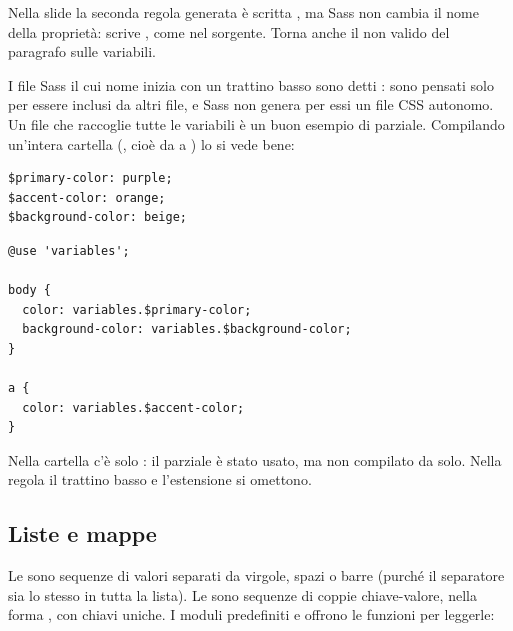 Nella slide la seconda regola generata è scritta ,
ma Sass non cambia il nome della proprietà: scrive , come nel
sorgente. Torna anche il  non valido del paragrafo sulle variabili.

I file Sass il cui nome inizia con un trattino basso sono detti
: sono pensati solo per essere inclusi da altri file, e Sass non
genera per essi un file CSS autonomo. Un file che raccoglie tutte le variabili
è un buon esempio di parziale. Compilando un'intera cartella
(, cioè \guillemotleft da  a
\guillemotright) lo si vede bene:

\begin{affianco}[0.45]
\begin{lstlisting}[style=css, name=scss/_variables.scss]
$primary-color: purple;
$accent-color: orange;
$background-color: beige;
\end{lstlisting}
\begin{lstlisting}[style=css, name=scss/style.scss]
@use 'variables';

body {
  color: variables.$primary-color;
  background-color: variables.$background-color;
}

a {
  color: variables.$accent-color;
}
\end{lstlisting}
\risultato
{}
\end{affianco}

Nella cartella  c'è solo : il parziale è stato usato,
ma non compilato da solo. Nella regola  il trattino basso e
l'estensione si omettono.

\subsection{Liste e mappe}

Le  sono sequenze di valori separati da virgole, spazi o barre
(purché il separatore sia lo stesso in tutta la lista). Le  sono
sequenze di coppie chiave-valore, nella forma , con
chiavi uniche. I moduli predefiniti  e  offrono
le funzioni per leggerle:

